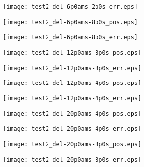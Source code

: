 \begin{figure}
    \centering
    \texttt{[image: test2\_del-6p0ams-2p0s\_err.eps]}
\end{figure}
\begin{figure}
    \centering
    \texttt{[image: test2\_del-6p0ams-8p0s\_pos.eps]}
\end{figure}
\begin{figure}
    \centering
    \texttt{[image: test2\_del-6p0ams-8p0s\_err.eps]}
    \label{oscillations}
\end{figure}
\begin{figure}
    \centering
    \texttt{[image: test2\_del-12p0ams-8p0s\_pos.eps]}
\end{figure}
\begin{figure}
    \centering
    \texttt{[image: test2\_del-12p0ams-8p0s\_err.eps]}
\end{figure}
\begin{figure}
    \centering
    \texttt{[image: test2\_del-12p0ams-4p0s\_pos.eps]}
\end{figure}
\begin{figure}
    \centering
    \texttt{[image: test2\_del-12p0ams-4p0s\_err.eps]}
\end{figure}
\clearpage
\begin{figure}
    \centering
    \texttt{[image: test2\_del-20p0ams-4p0s\_pos.eps]}
\end{figure}
\begin{figure}
    \centering
    \texttt{[image: test2\_del-20p0ams-4p0s\_err.eps]}
\end{figure}
\begin{figure}
    \centering
    \texttt{[image: test2\_del-20p0ams-8p0s\_pos.eps]}
\end{figure}
\begin{figure}
    \centering
    \texttt{[image: test2\_del-20p0ams-8p0s\_err.eps]}
\end{figure}
